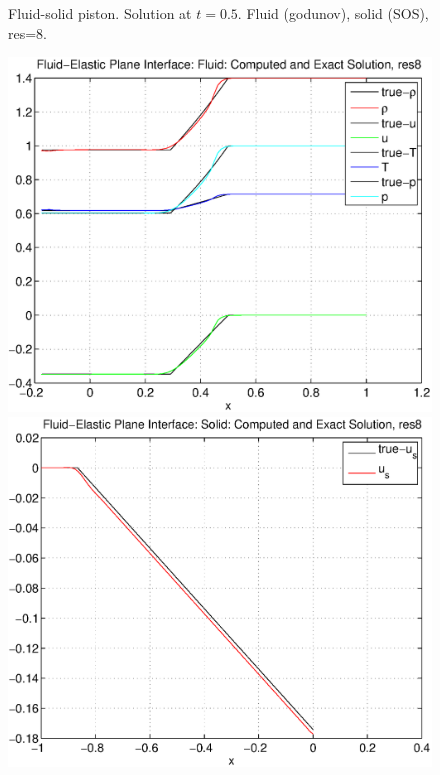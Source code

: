 {\begin{figure}[h]
\caption{Fluid-solid piston. Solution at $t=0.5$. Fluid (godunov), solid (SOS), res=8.}
\label{fig:fluidSolidPistonSOS8}
\end{figure}
\begin{figure}[h]
\includegraphics[width=\fwidth]{fluidElastic_planeInterfacegFluid_res8.eps}
\includegraphics[width=\fwidth]{fluidElastic_planeInterfacegSolid_res8.eps}

\end{figure}}
